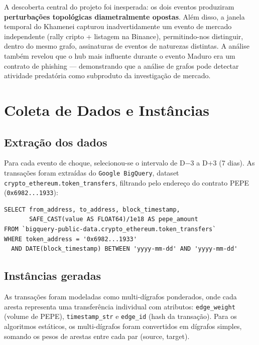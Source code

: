 \documentclass[12pt,a4paper]{article}
\begin{document}
A descoberta central do projeto foi inesperada: os dois eventos produziram \textbf{perturbações topológicas diametralmente opostas}. Além disso, a janela temporal do Khamenei capturou inadvertidamente um evento de mercado independente (rally cripto + listagem na Binance), permitindo-nos distinguir, dentro do mesmo grafo, assinaturas de eventos de naturezas distintas. A análise também revelou que o hub mais influente durante o evento Maduro era um contrato de phishing --- demonstrando que a análise de grafos pode detectar atividade predatória como subproduto da investigação de mercado.

\section{Coleta de Dados e Instâncias}

\subsection{Extração dos dados}

Para cada evento de choque, selecionou-se o intervalo de D$-$3 a D$+$3 (7 dias). As transações foram extraídas do \texttt{Google BigQuery}, dataset \texttt{crypto\_ethereum.token\_transfers}, filtrando pelo endereço do contrato PEPE (\texttt{0x6982...1933}):

\begin{verbatim}
SELECT from_address, to_address, block_timestamp,
       SAFE_CAST(value AS FLOAT64)/1e18 AS pepe_amount
FROM `bigquery-public-data.crypto_ethereum.token_transfers`
WHERE token_address = '0x6982...1933'
  AND DATE(block_timestamp) BETWEEN 'yyyy-mm-dd' AND 'yyyy-mm-dd'
\end{verbatim}

\subsection{Instâncias geradas}

As transações foram modeladas como multi-dígrafos ponderados, onde cada aresta representa uma transferência individual com atributos: \texttt{edge\_weight} (volume de PEPE), \texttt{timestamp\_str} e \texttt{edge\_id} (hash da transação). Para os algoritmos estáticos, os multi-dígrafos foram convertidos em dígrafos simples, somando os pesos de arestas entre cada par (source, target).
\end{document}
